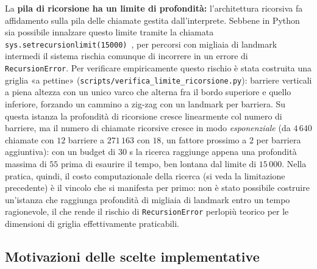 \begin{enumerate}
    \begin{sloppypar}
    \item La \textbf{pila di ricorsione ha un limite di profondità:} l'architettura ricorsiva fa affidamento sulla pila delle chiamate gestita dall'interprete. Sebbene in Python sia possibile innalzare questo limite tramite la chiamata \texttt{sys.setrecursionlimit(15000)}~\cite{python-recursionlimit}, per percorsi con migliaia di landmark intermedi il sistema rischia comunque di incorrere in un errore di \texttt{RecursionError}. Per verificare empiricamente questo rischio è stata costruita una griglia «a pettine» (\texttt{scripts/verifica\_limite\_ricorsione.py}): barriere verticali a piena altezza con un unico varco che alterna fra il bordo superiore e quello inferiore, forzando un cammino a zig-zag con un landmark per barriera. Su questa istanza la profondità di ricorsione cresce linearmente col numero di barriere, ma il numero di chiamate ricorsive cresce in modo \textit{esponenziale} (da $4\,640$ chiamate con $12$ barriere a $271\,163$ con $18$, un fattore prossimo a $2$ per barriera aggiuntiva): con un budget di $30$ s la ricerca raggiunge appena una profondità massima di $55$ prima di esaurire il tempo, ben lontana dal limite di $15\,000$. Nella pratica, quindi, il costo computazionale della ricerca (si veda la limitazione precedente) è il vincolo che si manifesta per primo: non è stato possibile costruire un'istanza che raggiunga profondità di migliaia di landmark entro un tempo ragionevole, il che rende il rischio di \texttt{RecursionError} perlopiù teorico per le dimensioni di griglia effettivamente praticabili.
    \end{sloppypar}
\end{enumerate}

\subsection{Motivazioni delle scelte implementative}

